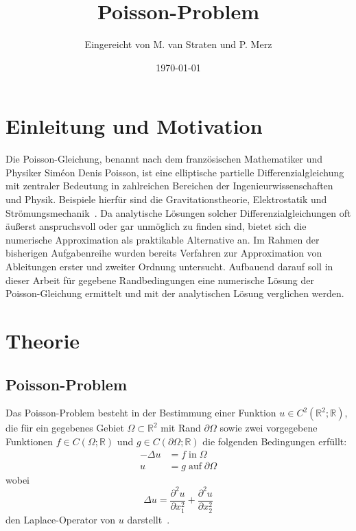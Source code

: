 \documentclass{scrartcl}
\title{Poisson-Problem}
\author{%
  Eingereicht von M. van Straten und P. Merz
}
\date{\today}
\newcommand\R{\mathbb{R}}
\begin{document}
\maketitle
\tableofcontents
\cleardoublepage%

\section{Einleitung und Motivation}

Die Poisson-Gleichung, benannt nach dem französischen Mathematiker und Physiker
Siméon Denis Poisson, ist eine elliptische partielle Differenzialgleichung mit
zentraler Bedeutung in zahlreichen Bereichen der Ingenieurwissenschaften und
Physik. Beispiele hierfür sind die Gravitationstheorie, Elektrostatik und
Strömungsmechanik\ \cite{Poisson}. Da analytische Lösungen solcher
Differenzialgleichungen oft äußerst anspruchsvoll oder gar unmöglich zu finden
sind, bietet sich die numerische Approximation als praktikable Alternative an.
Im Rahmen der bisherigen Aufgabenreihe wurden bereits Verfahren zur
Approximation von Ableitungen erster und zweiter Ordnung untersucht. Aufbauend
darauf soll in dieser Arbeit für gegebene Randbedingungen eine numerische
Lösung der Poisson-Gleichung ermittelt und mit der analytischen Lösung
verglichen werden.

\section{Theorie}

\subsection{Poisson-Problem}

Das Poisson-Problem besteht in der Bestimmung einer Funktion \(u \in C^2(\R^2;
\R)\), die für ein gegebenes Gebiet \(\Omega \subset \R^2\) mit Rand \(\partial
\Omega\) sowie zwei vorgegebene Funktionen \(f \in C(\Omega; \R)\) und \(g \in
C(\partial \Omega; \R)\) die folgenden Bedingungen erfüllt:
\begin{align*}
    -\Delta u & = f \; \text{in} \; \Omega           \\
    u         & = g \; \text{auf} \; \partial \Omega
\end{align*}
wobei
\begin{equation*}
    \Delta u = \frac{\partial^2 u}{\partial x_1^2} + \frac{\partial^2 u}{\partial x_2^2}
\end{equation*}
den Laplace-Operator von \(u\) darstellt\ \cite{PPI_Poisson}.
\end{document}
